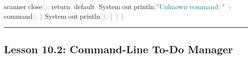 \documentclass[
  justified,
  openright,
]{tufte-book}
\newcommand{\BuiltInTok}[1]{#1}
\newcommand{\ControlFlowTok}[1]{\textcolor{BrandBlue}{#1}}
\newcommand{\FunctionTok}[1]{\textcolor{BrandBlue}{#1}}
\newcommand{\KeywordTok}[1]{\textcolor{BrandBlue}{#1}}
\newcommand{\NormalTok}[1]{#1}
\newcommand{\OperatorTok}[1]{\textcolor{DarkGray}{#1}}
\newcommand{\StringTok}[1]{\textcolor{Teal}{#1}}
\newenvironment{Shaded}{%
  \begin{snugshade}
}{%
  \end{snugshade}
}
\begin{document}
\begin{Shaded}
\begin{Highlighting}[]
\NormalTok{                    scanner}\OperatorTok{.}\FunctionTok{close}\OperatorTok{();}
                    \ControlFlowTok{return}\OperatorTok{;}
                \KeywordTok{default}\OperatorTok{:}
                    \BuiltInTok{System}\OperatorTok{.}\FunctionTok{out}\OperatorTok{.}\FunctionTok{println}\OperatorTok{(}\StringTok{"Unknown command: "} \OperatorTok{+}\NormalTok{ command}\OperatorTok{);}
            \OperatorTok{\}}
            \BuiltInTok{System}\OperatorTok{.}\FunctionTok{out}\OperatorTok{.}\FunctionTok{println}\OperatorTok{();}
        \OperatorTok{\}}
    \OperatorTok{\}}
\OperatorTok{\}}
\end{Highlighting}
\end{Shaded}

\begin{center}\rule{0.5\linewidth}{0.5pt}\end{center}

\subsection{Lesson 10.2: Command-Line To-Do
Manager}\label{lesson-10.2-command-line-to-do-manager}
\end{document}
